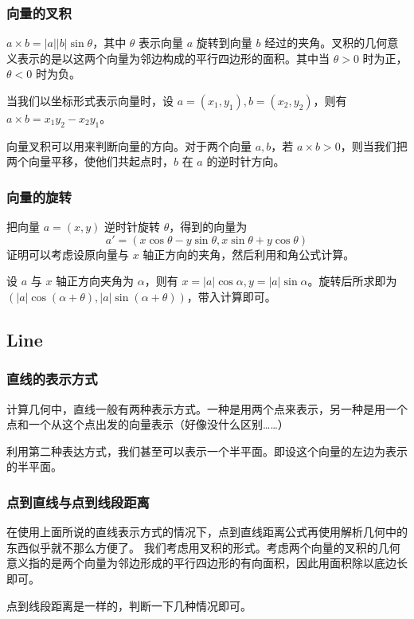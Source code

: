 \documentclass[10pt]{beamer}
\begin{document}
\begin{CJK}{UTF8}{gkai}
\begin{spacing}{1.2}
\begin{frame}
		\end{frame}
		\begin{frame}
			\frametitle{向量的叉积}

			$a \times b = |a||b| \sin \theta$，其中 $\theta$ 表示向量 $a$ 旋转到向量 $b$ 经过的夹角。叉积的几何意义表示的是以这两个向量为邻边构成的平行四边形的面积。其中当 $\theta > 0$ 时为正，$\theta < 0$ 时为负。 \pause

			当我们以坐标形式表示向量时，设 $a=(x_1,y_1),b=(x_2,y_2)$，则有 $a \times b = x_1y_2-x_2y_1$。 \pause

			向量叉积可以用来判断向量的方向。对于两个向量 $a,b$，若 $a \times b > 0$，则当我们把两个向量平移，使他们共起点时，$b$ 在 $a$ 的逆时针方向。

		\end{frame}
		\begin{frame}
			\frametitle{向量的旋转}

			把向量 $a=(x,y)$ 逆时针旋转 $\theta$，得到的向量为 $$a'=(x \cos \theta - y \sin \theta,x \sin \theta + y \cos \theta)$$ \pause
			证明可以考虑设原向量与 $x$ 轴正方向的夹角，然后利用和角公式计算。 \pause
			
			设 $a$ 与 $x$ 轴正方向夹角为 $\alpha$，则有 $x = |a| \cos \alpha,y = |a| \sin \alpha$。旋转后所求即为 $(|a| \cos(\alpha + \theta) , |a| \sin(\alpha + \theta))$，带入计算即可。

		\end{frame}
		\subsection{Line}
		\begin{frame}
			\frametitle{直线的表示方式}

			计算几何中，直线一般有两种表示方式。一种是用两个点来表示，另一种是用一个点和一个从这个点出发的向量表示（好像没什么区别……） \pause

			利用第二种表达方式，我们甚至可以表示一个半平面。即设这个向量的左边为表示的半平面。

		\end{frame}
		\begin{frame}
			\frametitle{点到直线与点到线段距离}

			在使用上面所说的直线表示方式的情况下，点到直线距离公式再使用解析几何中的东西似乎就不那么方便了。 \pause 我们考虑用叉积的形式。考虑两个向量的叉积的几何意义指的是两个向量为邻边形成的平行四边形的有向面积，因此用面积除以底边长即可。 \pause

			点到线段距离是一样的，判断一下几种情况即可。


\end{frame}
\end{spacing}
\end{CJK}
\end{document}
